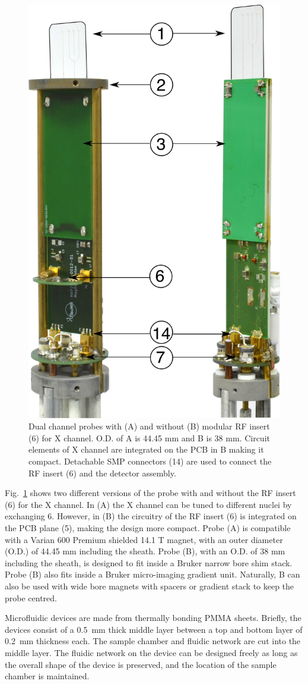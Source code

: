 \documentclass[preprint,5p]{elsarticle}
\newcommand{\fig}[1]{Fig.~\ref{#1}}
\begin{document}
\begin{figure}
\centering
\includegraphics[width=.5\linewidth,keepaspectratio=true]{./figures/ms5n17-tlp-im-181007-both-detectors.png}
\caption{Dual channel probes with (A) and without (B) modular RF insert (6) for X channel. 
O.D. of A is 44.45 mm and B is 38 mm. Circuit elements of X channel are integrated on the 
PCB in B making it compact. Detachable SMP connectors (14) are used to 
connect the RF insert (6) and the detector assembly.}
\label{fig:ProbePhoto}
\end{figure}
\fig{fig:ProbePhoto} shows two different versions of the probe with and without the RF insert (6) 
for the X channel. In (A) the X channel can be tuned to different nuclei by exchanging 6. 
However, in (B) the circuitry of the RF insert (6) is integrated on the PCB plane (5), 
making the design more compact.
 Probe (A) is compatible with a Varian 600 Premium shielded 14.1 T magnet, with an outer diameter (O.D.) of 44.45 mm including the sheath. Probe (B), with an 
O.D. of 38 mm including the sheath, is designed to fit inside a 
Bruker narrow bore shim stack. 
Probe (B) also fits inside a Bruker micro-imaging gradient unit. Naturally, B can also be used with 
wide bore magnets with spacers or gradient stack to keep the probe centred.

Microfluidic devices are made from thermally bonding PMMA sheets.
Briefly, the devices consist of a 0.5~mm thick middle layer between a top and bottom layer of 
0.2~mm thickness each. The sample chamber and fluidic network are cut into the middle layer.
The fluidic network on the device can be designed freely as long as the overall shape of the
device is preserved, and the location of the sample chamber is maintained.
\end{document}
